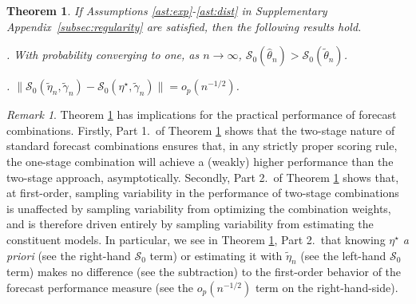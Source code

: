 \documentclass[12pt]{article}
\newtheorem{theorem}{Theorem}
\theoremstyle{definition}
\theoremstyle{remark}
\newtheorem{remark}{Remark}
\renewcommand{\appendixname}{Supplementary Appendix}
\begin{document}
\begin{theorem}
\label{thm:one} If Assumptions \ref{ast:exp}-\ref{ast:dist} in \appendixname\ \ref{subsec:regularity} are satisfied, then the following results hold.

\smallskip

. With probability converging to one, as $n\rightarrow\infty$, $\mathcal{S}_0(\hat\theta_n) > \mathcal{S}_0(\tilde\theta_n)$.

\smallskip

. $\|\mathcal{S}_0(\tilde{\eta}_{n}, \tilde{\gamma}_{n}) - \mathcal{S}_0(\eta^{\star}, \tilde{\gamma}_{n}) \| = o_p(n^{-1/2})$.

\end{theorem}

\begin{remark}
\label{rmk:oracle} Theorem \ref{thm:one} has implications for the practical performance of forecast combinations. Firstly, Part 1.\ of Theorem \ref{thm:one} shows that the two-stage nature of standard forecast combinations ensures that, in any strictly proper scoring rule, the one-stage combination will achieve a (weakly) higher performance than the two-stage approach, asymptotically. Secondly, Part 2.\ of Theorem \ref{thm:one} shows that, at first-order, sampling variability in the performance of two-stage combinations is unaffected by sampling variability from optimizing the combination weights, and is therefore driven entirely by sampling variability from estimating the constituent models. In particular, we see in Theorem \ref{thm:one}, Part 2.\ that knowing $\eta ^{\star }$ \textit{a priori} (see the right-hand $\mathcal{S}_{0}$ term) or estimating it with $\tilde{\eta}_{n}$ (see the left-hand $\mathcal{S}_{0}$ term) makes no difference (see the subtraction) to the first-order behavior of the forecast performance measure (see the $o_{p}(n^{-1/2})$ term on the right-hand-side).
\end{remark}
\end{document}
